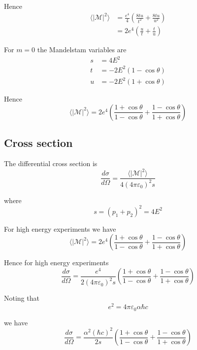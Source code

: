 \documentclass[12pt]{article}
\begin{document}
Hence
\begin{align*}
\langle|\mathcal{M}|^2\rangle
&=
\frac{e^4}{4}
\left(
\frac{8tu}{t^2}
+\frac{8tu}{u^2}
\right)
\\
&=
2e^4
\left(
\frac{u}{t}
+\frac{t}{u}
\right)
\end{align*}

For $m=0$ the Mandelstam variables are
\begin{align*}
s&=4E^2\\
t&=-2E^2(1-\cos\theta)
\\
u&=-2E^2(1+\cos\theta)
\end{align*}

Hence
\begin{equation*}
\langle|\mathcal{M}|^2\rangle
=2e^4\left(
\frac{1+\cos\theta}{1-\cos\theta}+
\frac{1-\cos\theta}{1+\cos\theta}
\right)
\end{equation*}

\subsection*{Cross section}
The differential cross section is
\begin{equation*}
\frac{d\sigma}{d\Omega}=\frac{\langle|\mathcal{M}|^2\rangle}{4(4\pi\varepsilon_0)^2s}
\end{equation*}

where
\begin{equation*}
s=(p_1+p_2)^2=4E^2
\end{equation*}

For high energy experiments we have
\begin{equation*}
\langle|\mathcal{M}|^2\rangle=2e^4\left(
\frac{1+\cos\theta}{1-\cos\theta}+
\frac{1-\cos\theta}{1+\cos\theta}
\right)
\end{equation*}

Hence for high energy experiments
\begin{equation*}
\frac{d\sigma}{d\Omega}
=\frac{e^4}{2(4\pi\varepsilon_0)^2s}\left(\frac{1+\cos\theta}{1-\cos\theta}+\frac{1-\cos\theta}{1+\cos\theta}\right)
\end{equation*}

Noting that
\begin{equation*}
e^2=4\pi\varepsilon_0\alpha\hbar c
\end{equation*}

we have
\begin{equation*}
\frac{d\sigma}{d\Omega}
=
\frac{\alpha^2(\hbar c)^2}{2s}
\left(
\frac{1+\cos\theta}{1-\cos\theta}+
\frac{1-\cos\theta}{1+\cos\theta}
\right)
\end{equation*}
\end{document}
